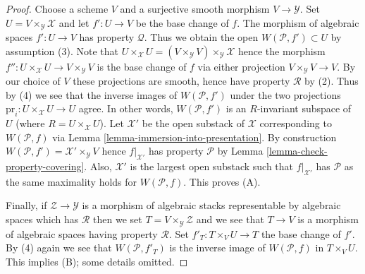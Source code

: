 \documentclass[10pt,a4paper]{amsart}
\theoremstyle{plain}
\theoremstyle{definition}
\theoremstyle{remark}
\numberwithin{equation}{subsection}
\begin{document}
\begin{proof}
Choose a scheme $V$ and a surjective smooth morphism $V \to \mathcal{Y}$.
Set $U = V \times_\mathcal{Y} \mathcal{X}$ and let $f' : U \to V$ be the
base change of $f$. The morphism of algebraic spaces $f' : U \to V$ has
property $\mathcal{Q}$. Thus we obtain the open $W(\mathcal{P}, f') \subset U$
by assumption (3). Note that
$U \times_\mathcal{X} U =
(V \times_\mathcal{Y} V) \times_\mathcal{Y} \mathcal{X}$
hence the morphism $f'' : U \times_\mathcal{X} U \to V \times_\mathcal{Y} V$
is the base change of $f$ via either projection
$V \times_\mathcal{Y} V \to V$. By our choice of $V$ these projections
are smooth, hence have property $\mathcal{R}$ by (2). Thus by (4) we see
that the inverse images of $W(\mathcal{P}, f')$ under the two projections
$\text{pr}_i : U \times_\mathcal{X} U \to U$ agree. In other words,
$W(\mathcal{P}, f')$ is an $R$-invariant subspace of $U$ (where
$R = U \times_\mathcal{X} U$). Let $\mathcal{X}'$ be the open substack of
$\mathcal{X}$ corresponding to $W(\mathcal{P}, f)$ via
Lemma \ref{lemma-immersion-into-presentation}.
By construction $W(\mathcal{P}, f') = \mathcal{X}' \times_\mathcal{Y} V$
hence $f|_{\mathcal{X}'}$ has property $\mathcal{P}$ by
Lemma \ref{lemma-check-property-covering}.
Also, $\mathcal{X}'$ is the largest open substack
such that $f|_{\mathcal{X}'}$ has $\mathcal{P}$ as the same maximality holds
for $W(\mathcal{P}, f)$. This proves (A).

\medskip\noindent
Finally, if $\mathcal{Z} \to \mathcal{Y}$ is a
morphism of algebraic stacks representable by algebraic spaces which has
$\mathcal{R}$ then we set $T = V \times_\mathcal{Y} \mathcal{Z}$ and
we see that $T \to V$ is a morphism of algebraic spaces having
property $\mathcal{R}$. Set $f'_T : T \times_V U \to T$ the base change
of $f'$. By (4) again we see that $W(\mathcal{P}, f'_T)$ is the
inverse image of $W(\mathcal{P}, f)$ in $T \times_V U$. This implies
(B); some details omitted.
\end{proof}
\end{document}
